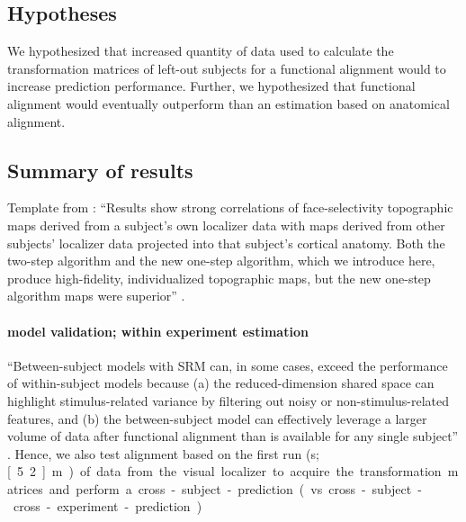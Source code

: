 \subsection{Hypotheses}

%
We hypothesized that increased quantity of data used to calculate the
transformation matrices of left-out subjects for a functional alignment would to
increase prediction performance.
%
Further, we hypothesized that functional alignment would eventually outperform
than an estimation based on anatomical alignment.


\subsection{Summary of results}



%
Template from \citet{jiahui2020predicting}: ``Results show strong correlations
of face-selectivity topographic maps derived from a subject's own localizer data
with maps derived from other subjects' localizer data projected into that
subject's cortical anatomy. Both the two-step algorithm and the new one-step
algorithm, which we introduce here, produce high-fidelity, individualized
topographic maps, but the new one-step algorithm maps were superior''
\citep{jiahui2020predicting}.


\paragraph{model validation; within experiment estimation}


%
``Between-subject models with SRM can, in some cases, exceed the performance of
within-subject models because (a) the reduced-dimension shared space can
highlight stimulus-related variance by filtering out noisy or
non-stimulus-related features, and (b) the between-subject model can effectively
leverage a larger volume of data after functional alignment than is available
for any single subject'' \citep{kumar2020brainiak}.
%
Hence, we also test alignment based on the first run (\unit[312]{s};
\unit[5.2]{m}) of data from
the visual localizer to acquire the transformation matrices and perform a
cross-subject-prediction (vs. cross-subject-cross-experiment-prediction)


